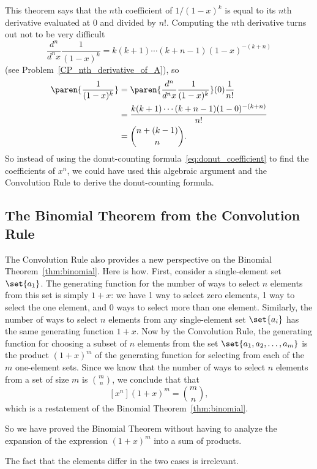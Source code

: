 This theorem says that the $n$th coefficient of $1 / (1 - x)^k$ is
equal to its $n$th derivative evaluated at 0 and divided by $n!$.
Computing the $n$th derivative turns out not to be very difficult
\[
\frac{d^n}{d^n x} \frac{1}{(1-x)^k} = k (k+1) \cdots (k + n - 1)(1-x)^{-(k+n)}
\]
(see Problem~\ref{CP_nth_derivative_of_A}), so
\begin{align*}
[x^n]\paren{\frac{1}{(1-x)^k}}
  & = \paren{\frac{d^n}{d^n x} \frac{1}{(1-x)^k}}(0)\frac{1}{n!}\\
  & = \frac{k (k+1) \cdots (k + n - 1)(1-0)^{-(k+n)}}{n!}\\
  & = \binom{n+ (k-1)}{n}.
\end{align*}
So instead of using the donut-counting
formula~\eqref{eq:donut_coefficient} to find the coefficients of
$x^n$, we could have used this algebraic argument and the Convolution
Rule to derive the donut-counting formula.

\subsection{The Binomial Theorem from the Convolution Rule}

The Convolution Rule also provides a new perspective on the Binomial
Theorem~\ref{thm:binomial}.  Here is how.  First, consider a
single-element set $\set{a_1}$.  The generating function for the
number of ways to select $n$ elements from this set is simply $1 + x$:
we have 1 way to select zero elements, 1 way to select the one
element, and 0 ways to select more than one element.  Similarly, the
number of ways to select $n$ elements from any single-element set
$\set{a_i}$ has the same generating function $1 + x$.  Now by the
Convolution Rule, the generating function for choosing a subset of $n$
elements from the set $\set{a_1,a_2,\dots,a_m}$ is the product
$(1+x)^m$ of the generating function for selecting from each of the
$m$ one-element sets.  Since we know that the number of ways to select
$n$ elements from a set of size $m$ is $\binom{m}{n}$, we conclude that
that
\[
[x^n](1+x)^m = \binom{m}{n},
\]
which is a restatement of the Binomial Theorem~\ref{thm:binomial}.

So we have proved the Binomial Theorem without having to analyze the
expansion of the expression $(1+x)^m$ into a sum of products.

\iffalse
The
fact that the elements differ in the two cases is irrelevant.

